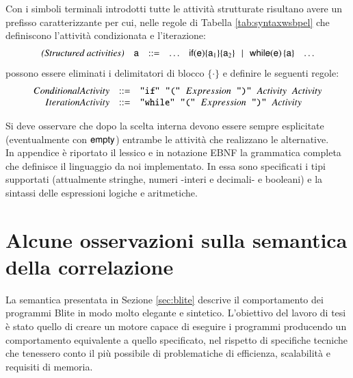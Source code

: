 Con i simboli terminali introdotti tutte le attività strutturate risultano
avere un prefisso caratterizzante per cui, nelle regole di Tabella
\ref{tab:syntaxwsbpel} che definiscono l'attività condizionata e l'iterazione:
$$
\begin{array}{rccccl}
\textit{(Structured activities)} & \xs & ::= & \ldots  &
\xif{\xe}{\xs_1}{\xs_2} \!\sepgr\! \xwhile{\xe}{\xs} & \ldots
\end{array}
$$ 
possono essere eliminati i delimitatori di blocco $\{\cdot \}$ e definire le
seguenti regole: $$
\begin{array}{rcl}
ConditionalActivity & ::= & \verb#"if"# \hspace{0.2cm} \verb#"("#
\hspace{0.2cm} Expression \hspace{0.2cm} \verb#")"#  \hspace{0.2cm} Activity
\hspace{0.2cm} Activity \\

IterationActivity & ::= & \verb#"while"# \hspace{0.2cm} \verb#"("#
\hspace{0.2cm} Expression \hspace{0.2cm} \verb#")"#  \hspace{0.2cm} Activity \\
\end{array}
$$

Si deve osservare che dopo la scelta interna devono essere sempre esplicitate
(eventualmente con ${\sf empty}$) entrambe le attività che realizzano le
alternative.
\\

In appendice è riportato il lessico e in notazione EBNF la grammatica completa
che definisce il linguaggio da noi implementato. In essa sono specificati
i tipi supportati (attualmente stringhe, numeri -interi e decimali- e booleani)
e la sintassi delle espressioni logiche e aritmetiche.

\section{Alcune osservazioni sulla semantica della correlazione}
\label{sec:semcor}

La semantica presentata in Sezione \ref{sec:blite} descrive il comportamento dei
programmi Blite in modo molto elegante e sintetico. L'obiettivo del lavoro di
tesi è stato quello di creare un motore capace di eseguire i programmi
producendo un comportamento equivalente a quello specificato, nel rispetto di specifiche
tecniche che tenessero conto il più possibile di problematiche di efficienza,
scalabilità e requisiti di memoria.

